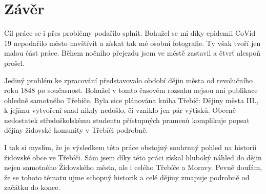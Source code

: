 \chapter*{Závěr}

Cíl práce se i přes problémy podařilo splnit.
Bohužel se mi díky epidemii CoVid--19 nepodařilo město navštívit a získat tak mé osobní fotografie.
Ty však tvoří jen malou část práce.
Během nočního přejezdu jsem ve městě zastavil a čtvrť alespoň prošel.

Jediný problém ke zpracování představovalo období dějin města od revolučního roku 1848 po současnost.
Bohužel v tomto časovém rozsahu nejsou ani publikace ohledně samotného Třebíče.
Byla sice plánována kniha Třebíč: Dějiny města III., k jejímu vytvoření snad nikdy nedošlo, či vzniklo jen pár výtisků.
Obecně nedostatek středoškolskému studentu přístupných pramenů komplikuje popsat dějiny židovské komunity v Třebíči podrobně.

I tak si myslím, že je výsledkem této práce obstojný souhrnný pohled na historii židovské obce ve Třebíči.
Sám jsem díky této práci získal hluboký náhled do dějin nejen samotného Židovského města, ale i celého Třebíče a Moravy.
Pevně doufám, že se tohoto tématu ujme schopný historik a celé dějiny zmapuje podrobně od začátku do konce.
